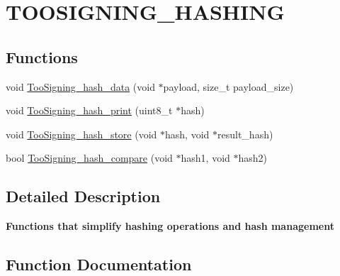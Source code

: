 \hypertarget{group__TOOSIGNING__HASHING}{}\section{T\+O\+O\+S\+I\+G\+N\+I\+N\+G\+\_\+\+H\+A\+S\+H\+I\+NG}
\label{group__TOOSIGNING__HASHING}
\subsection*{Functions}
\begin{DoxyCompactItemize}
\item 
void \hyperlink{group__TOOSIGNING__HASHING_gafb2935303b05255e80a7a6fa4be7cf57}{Too\+Signing\+\_\+hash\+\_\+data} (void $\ast$payload, size\+\_\+t payload\+\_\+size)
\item 
void \hyperlink{group__TOOSIGNING__HASHING_ga7696a20bc1d03d129afbdc8d6e446aa2}{Too\+Signing\+\_\+hash\+\_\+print} (uint8\+\_\+t $\ast$hash)
\item 
void \hyperlink{group__TOOSIGNING__HASHING_gae743dd1289d92f915352e40b047b4cc8}{Too\+Signing\+\_\+hash\+\_\+store} (void $\ast$hash, void $\ast$result\+\_\+hash)
\item 
bool \hyperlink{group__TOOSIGNING__HASHING_ga3a6687a23b6971e4053bef8328e347dd}{Too\+Signing\+\_\+hash\+\_\+compare} (void $\ast$hash1, void $\ast$hash2)
\end{DoxyCompactItemize}


\subsection{Detailed Description}
{\bfseries Functions that simplify hashing operations and hash management} 

\subsection{Function Documentation}
\mbox{\label{group__TOOSIGNING__HASHING_ga3a6687a23b6971e4053bef8328e347dd}} 
